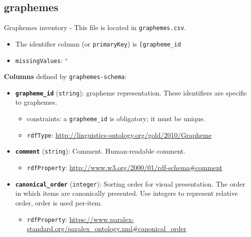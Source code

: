 \hypertarget{graphemes}{%
\subsection{\texorpdfstring{\textbf{graphemes}}{graphemes}}\label{graphemes}}

Graphemes inventory - This file is located in \texttt{graphemes.csv}.

\begin{itemize}
\tightlist
\item
  The identifier column (or \texttt{primaryKey}) is
  \texttt{{[}\textquotesingle{}grapheme\_id\textquotesingle{}{]}}
\item
  \texttt{missingValues}: ``
\end{itemize}

\textbf{Columns} defined by \texttt{graphemes-schema}:

\begin{itemize}
\item
  \textbf{\texttt{grapheme\_id}} (\texttt{string}): grapheme
  representation. These identifiers are specific to graphemes.

  \begin{itemize}
  \item
    constraints: a \texttt{grapheme\_id} is obligatory; it must be
    unique.
  \item
    \texttt{rdfType}:
    \url{http://linguistics-ontology.org/gold/2010/Grapheme}
  \end{itemize}
\item
  \textbf{\texttt{comment}} (\texttt{string}): Comment. Human-readable
  comment.

  \begin{itemize}
  \tightlist
  \item
    \texttt{rdfProperty}:
    \url{http://www.w3.org/2000/01/rdf-schema\#comment}
  \end{itemize}
\item
  \textbf{\texttt{canonical\_order}} (\texttt{integer}): Sorting order
  for visual presentation. The order in which items are canonically
  presented. Use integers to represent relative order, order is used
  per-item.

  \begin{itemize}
  \tightlist
  \item
    \texttt{rdfProperty}:
    \url{https://www.paralex-standard.org/paralex_ontology.xml\#canonical_order}
  \end{itemize}
\end{itemize}

